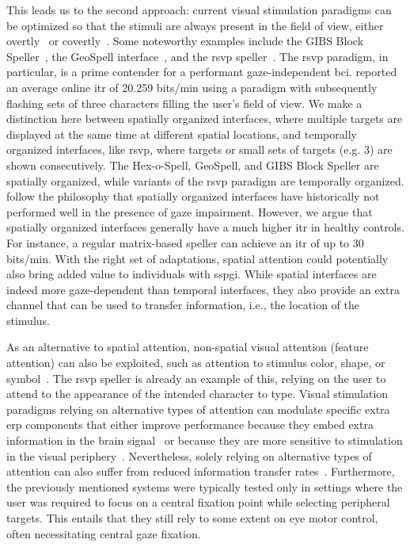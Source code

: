 This leads us to the second approach: current visual stimulation paradigms can be optimized so that
the stimuli are always present in the field of view, either overtly~\cite{Acqualagna2013, Won2018, Lin2018} or covertly~\cite{Pires2011,Lees2018}.
Some noteworthy examples include the GIBS Block Speller~\parencite{Pires2011},
the GeoSpell interface~\parencite{Aloise2012}, and the \ac{rsvp}
speller~\parencite{Acqualagna2011}.
The \ac{rsvp} paradigm, in particular, is a prime contender for a performant gaze-independent
\ac{bci}.
\textcite{Lin2018} reported an average online \ac{itr} of 20.259 bits/min using
a paradigm with subsequently flashing sets of three characters filling the user's field of view.
We make a distinction here between spatially organized interfaces, where
multiple targets are displayed at the same time at different spatial locations,
and temporally organized interfaces, like \ac{rsvp}, where targets or small
sets of targets (e.g. 3) are shown consecutively.
The Hex-o-Spell, GeoSpell, and GIBS Block Speller are spatially organized, while
variants of the \ac{rsvp} paradigm are temporally organized.
\textcite{Lin2018} follow the philosophy that spatially organized interfaces
have historically not performed well in the presence of gaze impairment.
However, we argue that spatially organized interfaces generally have a much higher
\ac{itr} in healthy controls.
For instance, a regular matrix-based speller can achieve an \ac{itr} of up to
30 bits/min.
With the right set of adaptations, spatial attention could potentially also
bring added value to individuals with \ac{sspgi}.
While spatial interfaces are indeed more gaze-dependent than temporal
interfaces, they also provide an extra channel that can be used to transfer
information, i.e., the location of the stimulus.

As an alternative to spatial attention, non-spatial visual attention (feature attention) can also be exploited, such as
attention to stimulus color, shape, or symbol~\cite{Zhang2010,Treder2011,Hwang2015}.
The \ac{rsvp} speller is already an example of this, relying on the user to
attend to the appearance of the intended character to type.
Visual stimulation paradigms relying on alternative types of attention
can modulate specific extra \ac{erp} components that either improve performance
because they embed extra information in the brain signal~\cite{Xu2022}
or because they are more sensitive to stimulation in the visual
periphery~\cite{Schaeff2012}.
Nevertheless, solely relying on alternative types of attention can also suffer from
reduced information transfer rates~\cite{Chennu2013}.
Furthermore, the previously mentioned systems were typically tested only in
settings where the user was required to focus on a central fixation point while
selecting peripheral targets.
This entails that they still rely to some extent on
eye motor control, often necessitating central gaze fixation.

